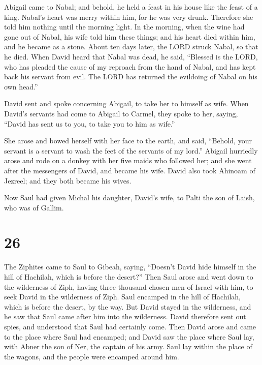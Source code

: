  Abigail came to Nabal; and behold, he held a feast in
his house like the feast of a king. Nabal's heart was merry within him,
for he was very drunk. Therefore she told him nothing until the morning
light.  In the morning, when the wine had gone out of
Nabal, his wife told him these things; and his heart died within him,
and he became as a stone.  About ten days later, the LORD
struck Nabal, so that he died.  When David heard that
Nabal was dead, he said, ``Blessed is the LORD, who has pleaded the
cause of my reproach from the hand of Nabal, and has kept back his
servant from evil. The LORD has returned the evildoing of Nabal on his
own head.''

David sent and spoke concerning Abigail, to take her to himself as wife.
 When David's servants had come to Abigail to Carmel,
they spoke to her, saying, ``David has sent us to you, to take you to
him as wife.''

 She arose and bowed herself with her face to the earth,
and said, ``Behold, your servant is a servant to wash the feet of the
servants of my lord.''  Abigail hurriedly arose and rode
on a donkey with her five maids who followed her; and she went after the
messengers of David, and became his wife.  David also
took Ahinoam of Jezreel; and they both became his wives.

 Now Saul had given Michal his daughter, David's wife, to
Palti the son of Laish, who was of Gallim.

\hypertarget{section-25}{%
\section{26}\label{section-25}}

 The Ziphites came to Saul to Gibeah, saying, ``Doesn't
David hide himself in the hill of Hachilah, which is before the
desert?''  Then Saul arose and went down to the wilderness
of Ziph, having three thousand chosen men of Israel with him, to seek
David in the wilderness of Ziph.  Saul encamped in the
hill of Hachilah, which is before the desert, by the way. But David
stayed in the wilderness, and he saw that Saul came after him into the
wilderness.  David therefore sent out spies, and
understood that Saul had certainly come.  Then David arose
and came to the place where Saul had encamped; and David saw the place
where Saul lay, with Abner the son of Ner, the captain of his army. Saul
lay within the place of the wagons, and the people were encamped around
him.

